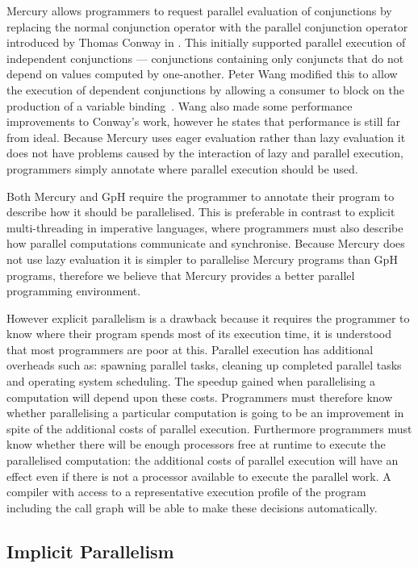 \label{ref:parallel_conjunction}
Mercury allows programmers to request parallel evaluation of
conjunctions by replacing the normal conjunction operator with the
parallel conjunction operator introduced by Thomas Conway in
\cite{conway:parallel-mercury}.
This initially supported parallel execution of independent
conjunctions --- conjunctions containing only conjuncts that do not depend on values
computed by one-another.
Peter Wang modified this to allow the execution of dependent conjunctions by
allowing a consumer to block on the production of a variable
binding~\cite{wang:parallel-mercury}.
Wang also made some performance improvements to Conway's work,
however he states that performance is still far from ideal.
Because Mercury uses eager evaluation rather than lazy evaluation it
does not have problems caused by the interaction of lazy and parallel
execution, programmers simply annotate where parallel execution
should be used.

Both Mercury and GpH require the programmer to annotate their
program to describe how it should be parallelised.
This is preferable in contrast to explicit multi-threading in
imperative languages, where programmers must also describe how
parallel computations communicate and synchronise.
Because Mercury does not use lazy evaluation it is simpler to
parallelise Mercury programs than GpH programs, therefore we believe
that Mercury provides a better parallel programming environment.

However explicit parallelism is a drawback because it requires the
programmer to know where their program spends most of its execution
time, it is understood that most programmers are poor at this.
Parallel execution has additional overheads such as:
spawning parallel tasks,
cleaning up completed parallel tasks and
operating system scheduling.
The speedup gained when parallelising a computation will depend upon
these costs.
Programmers must therefore know whether parallelising a particular
computation is going to be an improvement in spite of the additional
costs of parallel execution.
Furthermore programmers must know whether there will be enough
processors free at runtime to execute the parallelised computation:
the additional costs of parallel execution will have an effect even
if there is not a processor available to execute the parallel work.
A compiler with access to a representative execution profile of the
program including the call graph will be able to make these decisions
automatically.


\subsection{Implicit Parallelism}
\label{sec:lit_implicit-parallelism}

